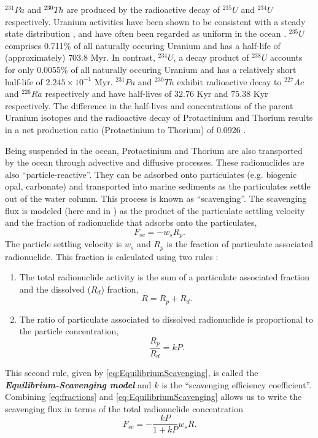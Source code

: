\documentclass{softwaremanual}
\begin{document}
$^{231}Pa$ and $^{230}Th$ are produced by the radioactive decay of $^{235}U$ and $^{234}U$ respectively. Uranium activities have been shown to be consistent with a steady state distribution \citep{Ku1977}, and have often been regarded as uniform in the ocean \citep{Anderson1983}. $^{235}U$ comprises 0.711\% of all naturally occuring Uranium and has a half-life of (approximately) $703.8$ Myr. In contrast, $^{234}U$, a decay product of $^{238}U$ accounts for only 0.0055\% of all naturally occuring Uranium and has a relatively short half-life of $2.245\times 10^{-1}$ Myr.  $^{231}Pa$ and $^{230}Th$ exhibit radioactive decay to $^{227}Ac$ and $^{226}Ra$ respectively and have half-lives of $32.76$ Kyr and $75.38$ Kyr respectively. The difference in the half-lives and concentrations of the parent Uranium isotopes and the radioactive decay of Protactinium and Thorium results in a net production ratio (Protactinium to Thorium) of 0.0926 \citep{Anderson1983}.

 Being suspended in the ocean, Protactinium and Thorium are also transported by the ocean through advective and diffusive processes. These radionuclides are also ``particle-reactive''. They can be adsorbed onto particulates (e.g. biogenic opal, carbonate) and transported into marine sediments as the particulates settle out of the water column. This process is known as ``scavenging''. The scavenging flux is modeled (here and in \citet{Siddall2007}) as the product of the particulate settling velocity and the fraction of radionuclide that adsorbs onto the particulates,
\begin{equation}
F_{sc} = -w_sR_p.
\end{equation}
The particle settling velocity is $w_s$ and $R_p$ is the fraction of particulate associated radionuclide. This fraction is calculated using two rules : 
\begin{enumerate}
   \item The total radionuclide activity is the sum of a particulate associated fraction and the dissolved ($R_d$) fraction,
\begin{equation}
R = R_p + R_d. \label{eq:fractions}
\end{equation}
\item  The ratio of particulate associated to dissolved radionuclide is proportional to the particle concentration,
\begin{equation}
\frac{R_p}{R_d} = k P. \label{eq:EquilibriumScavenging}
\end{equation}
\end{enumerate}
This second rule, given by \eqref{eq:EquilibriumScavenging}, is called the \textbf{\textit{Equilibrium-Scavenging model}} and $k$ is the ``scavenging efficiency coefficient''. Combining \eqref{eq:fractions} and \eqref{eq:EquilibriumScavenging} allows us to write the scavenging flux in terms of the total radionuclide concentration
\begin{equation}
F_{sc} = -\frac{k P}{1 + k P} w_s  R. 
\end{equation}
\end{document}
